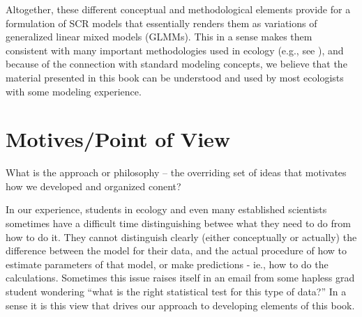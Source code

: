 Altogether, these different conceptual and methodological elements
provide for a formulation of SCR models that essentially renders them
as variations of generalized linear mixed models (GLMMs). This in a
sense makes them consistent with many important methodologies used in
ecology (e.g., see \citet{zuur_etal:2009, kery_etal:2010}), and
because of the connection with standard modeling concepts, we believe
that the material presented in this book can be understood and used by
most ecologists with some modeling experience.




\section*{Motives/Point of View}

What is the approach or philosophy -- the overriding set of ideas that
motivates how we developed and organized conent?

In our experience, students in ecology
and even many established scientists sometimes have a difficult time
distinguishing betwee what they need to do from how to do it.  They
cannot distinguish clearly (either conceptually or actually) the
difference between the model for their data, and the actual procedure
of how to estimate parameters of that model, or make predictions -
ie., how to do the calculations. Sometimes this issue raises itself in
an email from some hapless grad student wondering ``what is the right
statistical test for this type of data?''  In a sense it is this view
that drives our approach to developing elements of this book.

